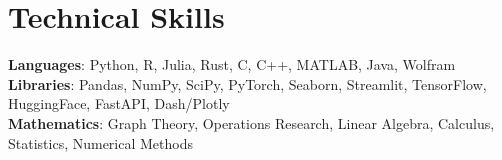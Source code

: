 \documentclass[letterpaper,11pt]{article}
\begin{document}
%
\section{Technical Skills}
 \begin{itemize}[leftmargin=0.15in, label={}]
    \small{\item{
     \textbf{Languages}{: Python, R, Julia, Rust, C, C++, MATLAB, Java, Wolfram} \\
     \textbf{Libraries}{: Pandas, NumPy, SciPy, PyTorch, Seaborn, Streamlit, TensorFlow, HuggingFace, FastAPI, Dash/Plotly} \\
     \textbf{Mathematics}{: Graph Theory, Operations Research, Linear Algebra, Calculus, Statistics, Numerical Methods }
    }}
 \end{itemize}


\end{document}
